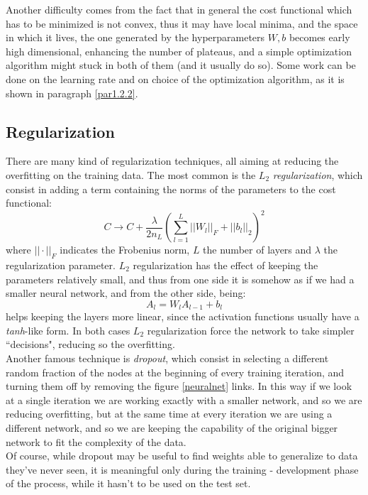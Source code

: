 \documentclass[12pt, a4paper]{report}
\theoremstyle{definition}
\begin{document}
{\begin{figure}[H]
	\caption{}\label{flowchart}
\end{figure}
\noindent Another difficulty comes from the fact that in general the cost functional which has to be minimized is not convex, thus it may have local minima, and the space in which it lives, the one generated by the hyperparameters $W,b$ becomes early high dimensional, enhancing the number of plateaus, and a simple optimization algorithm might stuck in both of them (and it usually do so). Some work can be done on the learning rate and on choice of the optimization algorithm, as it is shown in paragraph \ref{par1.2.2}.\\

\subsection{Regularization}\label{par1.2.1}
There are many kind of regularization techniques, all aiming at reducing the overfitting on the training data. The most common is the $L_2$ \textit{regularization}, which consist in adding a term containing the norms of the parameters to the cost functional:
\[
C \longrightarrow C + \frac{\lambda}{2n_L}\left( \sum_{l=1}^{L}||W_l||_F + ||b_l||_2 \right)^2
\]
where $||\cdot||_F$ indicates the Frobenius norm, $L$ the number of layers and  $\lambda$ the regularization parameter. $L_2$ regularization has the effect of keeping the parameters relatively small, and thus from one side it is somehow as if we had a smaller neural network, and from the other side, being:
\[
A_l=W_lA_{l-1}+b_l
\]
helps keeping the layers more linear, since the activation functions usually have a \textit{tanh}-like form. In both cases $L_2$ regularization force the network to take simpler ``decisions", reducing so the overfitting.\\
Another famous technique is \textit{dropout}, which consist in selecting a different random fraction of the nodes at the beginning of every training iteration, and turning them off by removing the figure \ref{neuralnet} links. In this way if we look at a single iteration we are working exactly with a smaller network, and so we are reducing overfitting, but at the same time at every iteration we are using a different network, and so we are keeping the capability of the original bigger network to fit the complexity of the data.\\
Of course, while dropout may be useful to find weights able to generalize to data they've never seen, it is meaningful only during the training - development phase of the process, while it hasn't to be used on the test set.

}
\end{document}

